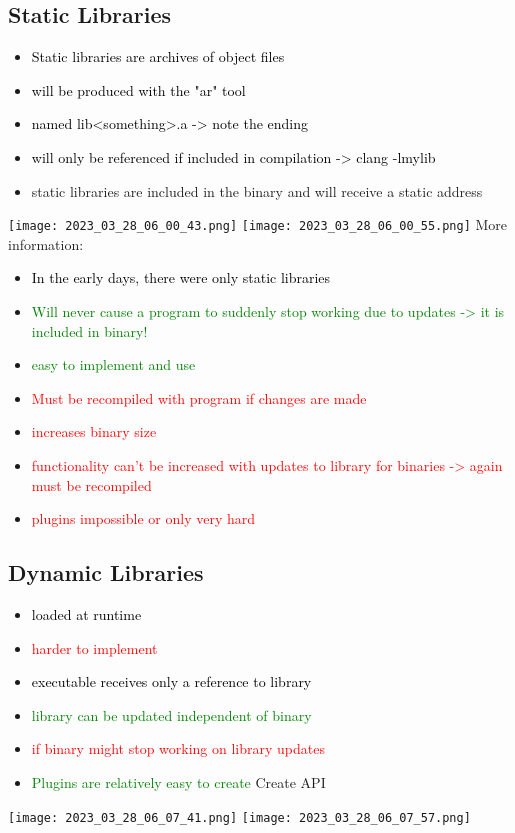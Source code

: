 \documentclass[main.tex,fontsize=8pt,paper=a4,paper=portrait,DIV=calc,]{scrartcl}
\begin{document}
\subsection{Static Libraries}
\begin{itemize}
\item \textcolor{black}{Static libraries are archives of object files}
\item \textcolor{black}{will be produced with the "ar" tool}
\item \textcolor{black}{named lib<something>.a -> note the ending}
\item \textcolor{black}{will only be referenced if included in compilation -> clang -lmylib}
\item static libraries are included in the binary and will receive a static address
\end{itemize} 
\texttt{[image: 2023\_03\_28\_06\_00\_43.png]}
\texttt{[image: 2023\_03\_28\_06\_00\_55.png]}\newline
More information:
\begin{itemize}
\item \textcolor{black}{In the early days, there were only static libraries}
\item \textcolor{green}{Will never cause a program to suddenly stop working due to updates -> it is included in binary!}
\item \textcolor{green}{easy to implement and use}
\item \textcolor{red}{Must be recompiled with program if changes are made}
\item \textcolor{red}{increases binary size}
\item \textcolor{red}{functionality can't be increased with updates to library for binaries -> again must be recompiled}
  \item \textcolor{red}{plugins impossible or only very hard}
\end{itemize} 

\subsection{Dynamic Libraries}
\begin{itemize}
\item \textcolor{black}{loaded at runtime}
\item \textcolor{red}{harder to implement}
\item \textcolor{black}{executable receives only a reference to library}
\item \textcolor{green}{library can be updated independent of binary}
\item \textcolor{red}{if binary might stop working on library updates} 
\item \textcolor{green}{Plugins are relatively easy to create}\newline
  Create API
\end{itemize} 
\texttt{[image: 2023\_03\_28\_06\_07\_41.png]}
\texttt{[image: 2023\_03\_28\_06\_07\_57.png]}
\end{document}
